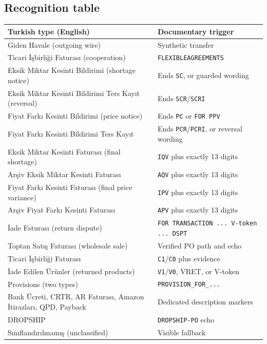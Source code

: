 \documentclass[11pt,a4paper]{article}
\theoremstyle{definition}
\begin{document}
\subsection{Recognition table}
\begin{longtable}{@{}p{}p{}@{}}
\toprule
\textbf{Turkish type (English)} & \textbf{Documentary trigger}\\
\midrule
\endhead
Giden Havale (outgoing wire) & Synthetic transfer\\
Ticari İşbirliği Faturası (cooperation) & \texttt{FLEXIBLEAGREEMENTS}\\
Eksik Miktar Kesinti Bildirimi (shortage notice) & Ends \texttt{SC}, or guarded wording\\
Eksik Miktar Kesinti Bildirimi Ters Kayıt (reversal) & Ends \texttt{SCR}/\texttt{SCRI}\\
Fiyat Farkı Kesinti Bildirimi (price notice) & Ends \texttt{PC} or \texttt{FOR PPV}\\
Fiyat Farkı Kesinti Bildirimi Ters Kayıt & Ends \texttt{PCR}/\texttt{PCRI}, or reversal wording\\
Eksik Miktar Kesinti Faturası (final shortage) & \texttt{IQV} plus exactly 13 digits\\
Arşiv Eksik Miktar Kesinti Faturası & \texttt{AQV} plus exactly 13 digits\\
Fiyat Farkı Kesinti Faturası (final price variance) & \texttt{IPV} plus exactly 13 digits\\
Arşiv Fiyat Farkı Kesinti Faturası & \texttt{APV} plus exactly 13 digits\\
İade Faturası (return dispute) & \texttt{FOR TRANSACTION ... V-token ... DSPT}\\
Toptan Satış Faturası (wholesale sale) & Verified PO path and echo\\
Ticari İşbirliği Faturası & \texttt{C1}/\texttt{C0} plus evidence\\
İade Edilen Ürünler (returned products) & \texttt{V1}/\texttt{V0}, VRET, or V-token\\
Provisions (two types) & \texttt{PROVISION\_FOR\_...}\\
Bank Ücreti, CRTR, AR Faturası, Amazon İtirazları, QPD, Payback & Dedicated description markers\\
DROPSHIP & \texttt{DROPSHIP-PO} echo\\
Sınıflandırılmamış (unclassified) & Visible fallback\\
\bottomrule
\end{longtable}
\end{document}
